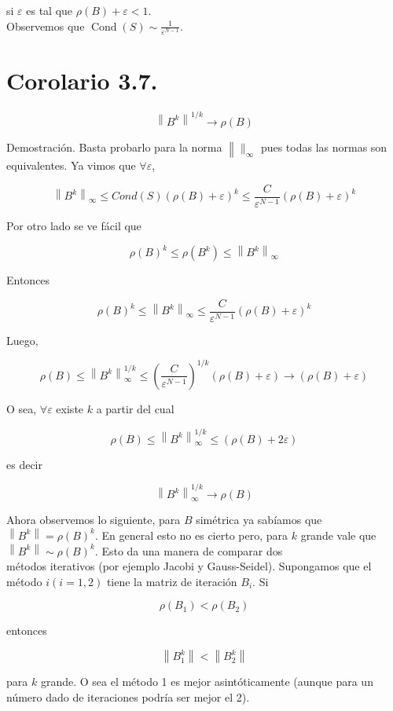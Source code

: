 \documentclass[10pt]{book}
\begin{document}
si $\varepsilon$ es tal que $\rho(B)+\varepsilon<1$.\\
Observemos que $\operatorname{Cond}(S) \sim \frac{1}{\varepsilon^{N-1}}$.

\section*{Corolario 3.7.}
$$
\left\|B^{k}\right\|^{1 / k} \rightarrow \rho(B)
$$

Demostración. Basta probarlo para la norma $\left\|\|_{\infty}\right.$ pues todas las normas son equivalentes. Ya vimos que $\forall \varepsilon$,

$$
\left\|B^{k}\right\|_{\infty} \leq C o n d(S)(\rho(B)+\varepsilon)^{k} \leq \frac{C}{\varepsilon^{N-1}}(\rho(B)+\varepsilon)^{k}
$$

Por otro lado se ve fácil que

$$
\rho(B)^{k} \leq \rho\left(B^{k}\right) \leq\left\|B^{k}\right\|_{\infty}
$$

Entonces

$$
\rho(B)^{k} \leq\left\|B^{k}\right\|_{\infty} \leq \frac{C}{\varepsilon^{N-1}}(\rho(B)+\varepsilon)^{k}
$$

Luego,

$$
\rho(B) \leq\left\|B^{k}\right\|_{\infty}^{1 / k} \leq\left(\frac{C}{\varepsilon^{N-1}}\right)^{1 / k}(\rho(B)+\varepsilon) \rightarrow(\rho(B)+\varepsilon)
$$

O sea, $\forall \varepsilon$ existe $k$ a partir del cual

$$
\rho(B) \leq\left\|B^{k}\right\|_{\infty}^{1 / k} \leq(\rho(B)+2 \varepsilon)
$$

es decir

$$
\left\|B^{k}\right\|_{\infty}^{1 / k} \rightarrow \rho(B)
$$

Ahora observemos lo siguiente, para $B$ simétrica ya sabíamos que $\left\|B^{k}\right\|=\rho(B)^{k}$. En general esto no es cierto pero, para $k$ grande vale que $\left\|B^{k}\right\| \sim \rho(B)^{k}$. Esto da una manera de comparar dos\\
métodos iterativos (por ejemplo Jacobi y Gauss-Seidel). Supongamos que el método $i(i=1,2)$ tiene la matriz de iteración $B_{i}$. Si

$$
\rho\left(B_{1}\right)<\rho\left(B_{2}\right)
$$

entonces

$$
\left\|B_{1}^{k}\right\|<\left\|B_{2}^{k}\right\|
$$

para $k$ grande. O sea el método 1 es mejor asintóticamente (aunque para un número dado de iteraciones podría ser mejor el 2).
\end{document}
